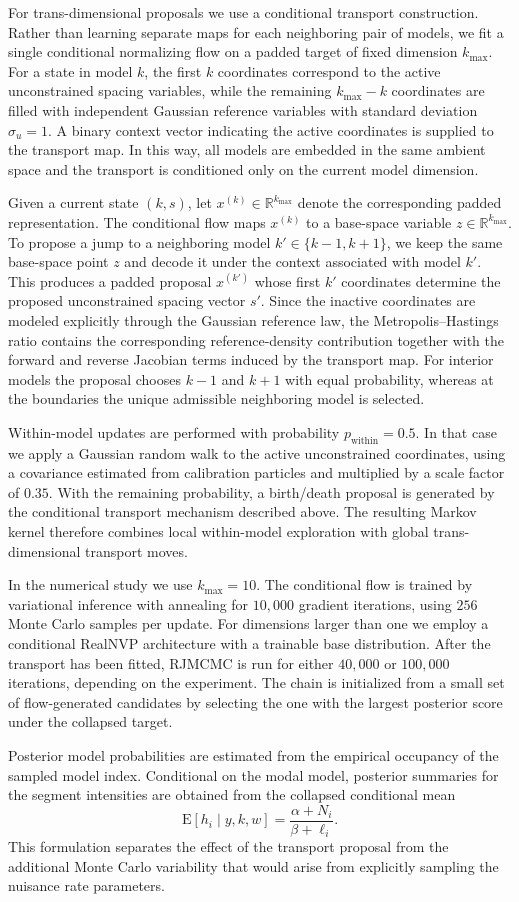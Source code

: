 For trans-dimensional proposals we use a conditional transport construction.
Rather than learning separate maps for each neighboring pair of models, we fit a
single conditional normalizing flow on a padded target of fixed dimension
$k_{\max}$. For a state in model $k$, the first $k$ coordinates correspond to
the active unconstrained spacing variables, while the remaining $k_{\max}-k$
coordinates are filled with independent Gaussian reference variables with
standard deviation $\sigma_u=1$. A binary context vector indicating the active
coordinates is supplied to the transport map. In this way, all models are
embedded in the same ambient space and the transport is conditioned only on the
current model dimension.

Given a current state $(k,s)$, let $x^{(k)}\in\mathbb{R}^{k_{\max}}$ denote the
corresponding padded representation. The conditional flow maps $x^{(k)}$ to a
base-space variable $z\in\mathbb{R}^{k_{\max}}$. To propose a jump to a
neighboring model $k'\in\{k-1,k+1\}$, we keep the same base-space point $z$ and
decode it under the context associated with model $k'$. This produces a padded
proposal $x^{(k')}$ whose first $k'$ coordinates determine the proposed
unconstrained spacing vector $s'$. Since the inactive coordinates are modeled
explicitly through the Gaussian reference law, the Metropolis--Hastings ratio
contains the corresponding reference-density contribution together with the
forward and reverse Jacobian terms induced by the transport map. For interior
models the proposal chooses $k-1$ and $k+1$ with equal probability, whereas at
the boundaries the unique admissible neighboring model is selected.

Within-model updates are performed with probability
$p_{\mathrm{within}}=0.5$. In that case we apply a Gaussian random walk to the
active unconstrained coordinates, using a covariance estimated from calibration
particles and multiplied by a scale factor of $0.35$. With the remaining
probability, a birth/death proposal is generated by the conditional transport
mechanism described above. The resulting Markov kernel therefore combines local
within-model exploration with global trans-dimensional transport moves.

In the numerical study we use $k_{\max}=10$. The conditional flow is trained by
variational inference with annealing for $10{,}000$ gradient iterations, using
$256$ Monte Carlo samples per update. For dimensions larger than one we employ a
conditional RealNVP architecture with a trainable base distribution. After the
transport has been fitted, RJMCMC is run for either $40{,}000$ or $100{,}000$
iterations, depending on the experiment. The chain is initialized from a small
set of flow-generated candidates by selecting the one with the largest posterior
score under the collapsed target.

Posterior model probabilities are estimated from the empirical occupancy of the
sampled model index. Conditional on the modal model, posterior summaries for the
segment intensities are obtained from the collapsed conditional mean
\[
\mathrm{E}[h_i\mid y,k,w]=\frac{\alpha+N_i}{\beta+\ell_i}.
\]
This formulation separates the effect of the transport proposal from the
additional Monte Carlo variability that would arise from explicitly sampling the
nuisance rate parameters.
